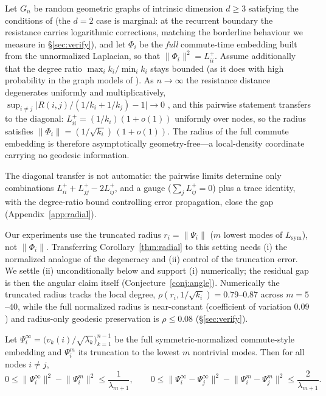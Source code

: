 \documentclass[review]{siamart220329}
\begin{document}
\begin{corollary}\label{thm:radial}
Let $G_n$ be random geometric graphs of intrinsic dimension $d\ge3$ satisfying
the conditions of \cite{vonluxburg2014} (the $d=2$ case is marginal: at the
recurrent boundary the resistance carries logarithmic corrections, matching the
borderline behaviour we measure in \S\ref{sec:verify}), and let $\Phi_i$ be the
\emph{full} commute-time embedding built from the unnormalized Laplacian, so that
$\lVert\Phi_i\rVert^2 = L^{+}_{ii}$. Assume additionally that the degree
ratio $\max_i k_i/\min_i k_i$ stays bounded (as it does with high probability in
the graph models of \cite{vonluxburg2014}). As $n\to\infty$ the resistance
distance degenerates uniformly and multiplicatively,
$\sup_{i\ne j}\big|R(i,j)/(1/k_i+1/k_j)-1\big|\to0$ \cite{vonluxburg2014},
and this pairwise statement transfers to the diagonal:
$L^{+}_{ii}{}=(1/k_i)(1+o(1))$ uniformly over nodes, so the radius
satisfies $\lVert\Phi_i\rVert = (1/\sqrt{k_i})\,(1+o(1))$. The radius of the full
commute embedding is therefore asymptotically geometry-free---a local-density
coordinate carrying no geodesic information.
\end{corollary}

\noindent The diagonal transfer is not automatic: the pairwise limits determine
only combinations $L^+_{ii}+L^+_{jj}-2L^+_{ij}$, and a gauge ($\sum_j L^+_{ij}=0$)
plus a trace identity, with the degree-ratio bound controlling error propagation,
close the gap (Appendix~\ref{app:radial}).

\begin{remark}
Our experiments use the truncated radius $r_i=\lVert\Psi_i\rVert$ ($m$ lowest
modes of $L_{\mathrm{sym}}$), not $\lVert\Phi_i\rVert$. Transferring
Corollary~\ref{thm:radial} to this setting needs (i) the normalized analogue of
the degeneracy \cite{vonluxburg2014} and (ii) control of the truncation error.
We settle (ii) unconditionally below and support (i) numerically; the residual
gap is then the angular claim itself (Conjecture~\ref{conj:angle}).
Numerically the truncated radius tracks the local degree,
$\rho(r_i,1/\sqrt{k_i})=0.79$--$0.87$ across $m=5$--$40$, while the full
normalized radius is near-constant (coefficient of variation $0.09$) and
radius-only geodesic preservation is $\rho\le0.08$ (\S\ref{sec:verify}).
\end{remark}

\begin{proposition}\label{prop:trunc}
Let $\Psi^{\infty}_i=\big(v_k(i)/\sqrt{\lambda_k}\big)_{k=1}^{n-1}$ be the full
symmetric-normalized commute-style embedding and $\Psi^{m}_i$ its truncation to
the lowest $m$ nontrivial modes. Then for all nodes $i\neq j$,
\[
0 \le \lVert\Psi^{\infty}_i\rVert^2 - \lVert\Psi^{m}_i\rVert^2
   \le \frac{1}{\lambda_{m+1}},
\qquad
0 \le \lVert\Psi^{\infty}_i-\Psi^{\infty}_j\rVert^2
     - \lVert\Psi^{m}_i-\Psi^{m}_j\rVert^2 \le \frac{2}{\lambda_{m+1}} .
\]
\end{proposition}
\end{document}
